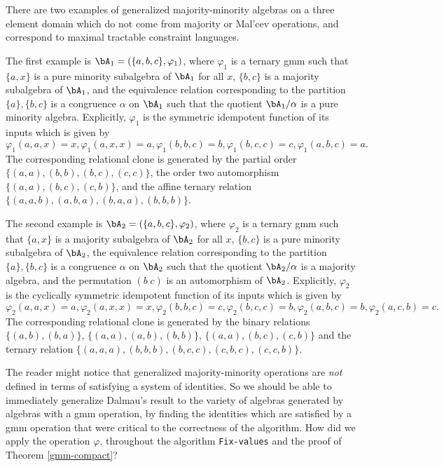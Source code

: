 There are two examples of generalized majority-minority algebras on a three element domain which do not come from majority or Mal'cev operations, and correspond to maximal tractable constraint languages.

\begin{ex}\label{gmm-ex-1} The first example is $\bA_1 = (\{a,b,c\}, \varphi_1)$, where $\varphi_1$ is a ternary gmm such that $\{a,x\}$ is a pure minority subalgebra of $\bA_1$ for all $x$, $\{b,c\}$ is a majority subalgebra of $\bA_1$, and the equivalence relation corresponding to the partition $\{a\}, \{b,c\}$ is a congruence $\alpha$ on $\bA_1$ such that the quotient $\bA_1/\alpha$ is a pure minority algebra. Explicitly, $\varphi_1$ is the symmetric idempotent function of its inputs which is given by
\[
\varphi_1(a,a,x) = x, \varphi_1(a,x,x) = a, \varphi_1(b,b,c) = b, \varphi_1(b,c,c) = c, \varphi_1(a,b,c) = a.
\]
The corresponding relational clone is generated by the partial order $\{(a,a),(b,b),(b,c),(c,c)\}$, the order two automorphism $\{(a,a),(b,c),(c,b)\}$, and the affine ternary relation $\{(a,a,b),(a,b,a),(b,a,a),(b,b,b)\}$.
\end{ex}

\begin{ex}\label{gmm-ex-2} The second example is $\bA_2 = (\{a,b,c\}, \varphi_2)$, where $\varphi_2$ is a ternary gmm such that $\{a,x\}$ is a majority subalgebra of $\bA_2$ for all $x$, $\{b,c\}$ is a pure minority subalgebra of $\bA_2$, the equivalence relation corresponding to the partition $\{a\}, \{b,c\}$ is a congruence $\alpha$ on $\bA_2$ such that the quotient $\bA_2/\alpha$ is a majority algebra, and the permutation $(b\; c)$ is an automorphism of $\bA_2$. Explicitly, $\varphi_2$ is the cyclically symmetric idempotent function of its inputs which is given by
\[
\varphi_2(a,a,x) = a, \varphi_2(a,x,x) = x, \varphi_2(b,b,c) = c, \varphi_2(b,c,c) = b, \varphi_2(a,b,c) = b, \varphi_2(a,c,b) = c.
\]
The corresponding relational clone is generated by the binary relations $\{(a,b),(b,a)\}$, $\{(a,a),(a,b),(b,b)\}$, $\{(a,a),(b,c),(c,b)\}$ and the ternary relation $\{(a,a,a),(b,b,b),(b,c,c),(c,b,c),(c,c,b)\}$.
\end{ex}

The reader might notice that generalized majority-minority operations are \emph{not} defined in terms of satisfying a system of identities. So we should be able to immediately generalize Dalmau's result to the variety of algebras generated by algebras with a gmm operation, by finding the identities which are satisfied by a gmm operation that were critical to the correctness of the algorithm. How did we apply the operation $\varphi$, throughout the algorithm \texttt{Fix-values} and the proof of Theorem \ref{gmm-compact}?

